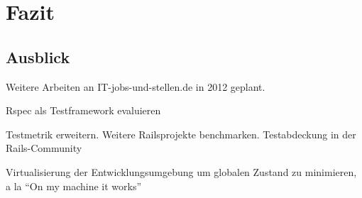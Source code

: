 \section{Fazit}

\subsection{Ausblick}
Weitere Arbeiten an IT-jobs-und-stellen.de in 2012 geplant.

Rspec als Testframework evaluieren

Testmetrik erweitern. Weitere Railsprojekte benchmarken. Testabdeckung in der Rails-Community

Virtualisierung der Entwicklungsumgebung um globalen Zustand zu minimieren, a la "`On my machine it works"'